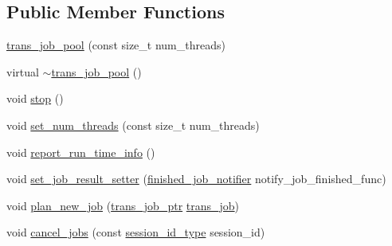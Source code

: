 \subsection*{Public Member Functions}
\begin{DoxyCompactItemize}
\item 
\hyperlink{classuva_1_1smt_1_1bpbd_1_1server_1_1trans__job__pool_a222effe11928f7e79efa1b741d8d2e80}{trans\+\_\+job\+\_\+pool} (const size\+\_\+t num\+\_\+threads)
\item 
virtual \hyperlink{classuva_1_1smt_1_1bpbd_1_1server_1_1trans__job__pool_ac8aeb8f1016c4b8fa7ffa6fdd71a689d}{$\sim$trans\+\_\+job\+\_\+pool} ()
\item 
void \hyperlink{classuva_1_1smt_1_1bpbd_1_1server_1_1trans__job__pool_af3e36a1c381816ce227ff6b911f04876}{stop} ()
\item 
void \hyperlink{classuva_1_1smt_1_1bpbd_1_1server_1_1trans__job__pool_aeeb65a9c9d0717e8c6f30a37fc34502d}{set\+\_\+num\+\_\+threads} (const size\+\_\+t num\+\_\+threads)
\item 
void \hyperlink{classuva_1_1smt_1_1bpbd_1_1server_1_1trans__job__pool_a783c385533968e581f0e5f90375d83dc}{report\+\_\+run\+\_\+time\+\_\+info} ()
\item 
void \hyperlink{classuva_1_1smt_1_1bpbd_1_1server_1_1trans__job__pool_aaeb9afbcb3ec190fff79dc36a9fc1f88}{set\+\_\+job\+\_\+result\+\_\+setter} (\hyperlink{classuva_1_1smt_1_1bpbd_1_1server_1_1trans__job__pool_a6a18b765d5a321e2bcc7e3be3213c06e}{finished\+\_\+job\+\_\+notifier} notify\+\_\+job\+\_\+finished\+\_\+func)
\item 
void \hyperlink{classuva_1_1smt_1_1bpbd_1_1server_1_1trans__job__pool_a5ddb309db4337a72239961c5f5b1efde}{plan\+\_\+new\+\_\+job} (\hyperlink{namespaceuva_1_1smt_1_1bpbd_1_1server_acb76132c82e66b5dbf7e3aa0e5af2580}{trans\+\_\+job\+\_\+ptr} \hyperlink{classuva_1_1smt_1_1bpbd_1_1server_1_1trans__job}{trans\+\_\+job})
\item 
void \hyperlink{classuva_1_1smt_1_1bpbd_1_1server_1_1trans__job__pool_a46e96b01e1e14d27ecabdb655f3cfa3c}{cancel\+\_\+jobs} (const \hyperlink{namespaceuva_1_1smt_1_1bpbd_1_1common_1_1messaging_a17ad17f94b78abb87ab5f3f3d6f09588}{session\+\_\+id\+\_\+type} session\+\_\+id)
\end{DoxyCompactItemize}

